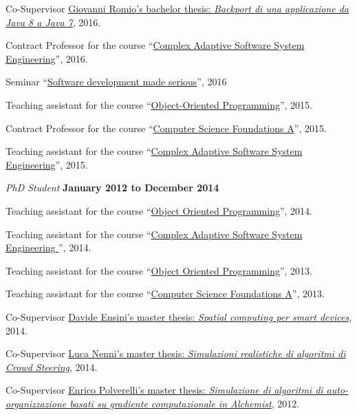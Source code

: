 \documentclass[10pt]{article}
\newenvironment{outerlist}[1][\enskip\textbullet]%
        {\begin{itemize}[#1]}{\end{itemize}%
         \vspace{-.6\baselineskip}}
\newenvironment{innerlist}[1][\enskip\textbullet]%
        {\begin{compactitem}[#1]}{\end{compactitem}}
\begin{document}
\begin{outerlist}
\begin{innerlist}
      \item Co-Supervisor \href{http://amslaurea.unibo.it/10481/}{Giovanni Romio's bachelor thesis: \textit{Backport di una applicazione da Java 8 a Java 7}}, 2016.
      \item Contract Professor for the course ``\href{http://apice.unibo.it/xwiki/bin/view/Courses/ISAC1516}{Complex Adaptive Software System Engineering}'', 2016.
      \item Seminar ``\href{https://www.slideshare.net/DanySK/software-development-made-serious}{Software development made serious}'', 2016
      \item Teaching assistant for the course ``\href{http://apice.unibo.it/xwiki/bin/view/Courses/OOP1516}{Object-Oriented Programming}'', 2015.
      \item Contract Professor for the course ``\href{http://www.apice.unibo.it/xwiki/bin/view/Courses/FINFA1415/}{Computer Science Foundations A}'', 2015.
      \item Teaching assistant for the course ``\href{http://apice.unibo.it/xwiki/bin/view/Courses/ISAC1415}{Complex Adaptive Software System Engineering}'', 2015.
    \end{innerlist}
\item[] \textit{PhD Student} \hfill \textbf{January 2012 to December 2014}
    \begin{innerlist}
      \item Teaching assistant for the course ``\href{http://apice.unibo.it/xwiki/bin/view/Courses/OOP1415}{Object Oriented Programming}'', 2014.
      \item Teaching assistant for the course ``\href{http://apice.unibo.it/xwiki/bin/view/Courses/ISAC1314}{Complex Adaptive Software System Engineering }'', 2014.
      \item Teaching assistant for the course ``\href{http://apice.unibo.it/xwiki/bin/view/Courses/OOP1314}{Object Oriented Programming}'', 2013.
      \item Teaching assistant for the course ``\href{http://www.apice.unibo.it/xwiki/bin/view/Courses/FINFA1213/}{Computer Science Foundations A}'', 2013.
      \item Co-Supervisor \href{http://amslaurea.unibo.it/7990/}{Davide Ensini's master thesis: \textit{Spatial computing per smart devices}}, 2014.
      \item Co-Supervisor \href{http://amslaurea.unibo.it/6927/}{Luca Nenni's master thesis: \textit{Simulazioni realistiche di algoritmi di Crowd Steering}}, 2014.
      \item Co-Supervisor \href{http://amslaurea.unibo.it/5293/}{Enrico Polverelli's master thesis: \textit{Simulazione di algoritmi di auto-organizzazione basati su gradiente computazionale in Alchemist}}, 2012.

\end{innerlist}
\end{outerlist}
\end{document}
